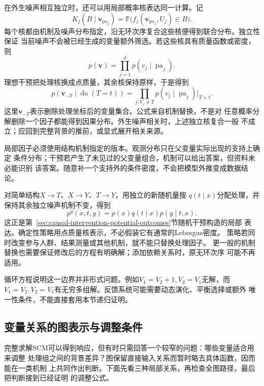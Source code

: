 在外生噪声相互独立时，还可以用局部概率核表达同一计算。记
\[
  K_j(B\mid\bm v_{\operatorname{pa}_j})
  =
  \mathbb P\bigl(f_j(\bm v_{\operatorname{pa}_j},U_j)\in B\bigr).
\]
每个核都由机制及噪声分布指定，沿无环次序复合这些核便得到联合分布。独立性保证
当前噪声不会被已经生成的变量额外筛选。若这些核具有质量函数或密度，则
\[
  p(\bm v)=\prod_{j=1}^d p(v_j\mid\operatorname{pa}_j).
\]
理想干预把处理核换成点质量，其余核保持原样，于是得到
\begin{equation}
  p(\bm v_{-T}\mid\operatorname{do}(T=t))
  =
  \prod_{j:V_j\ne T}
  p(v_j\mid\operatorname{pa}_j)\big|_{T=t}.
  \label{eq:causal-truncated-factorization}
\end{equation}
这里\(\bm v_{-T}\)表示删除处理坐标后的变量集合。公式来自机制替换，不是对
任意概率分解删除一个因子都能得到因果分布。外生噪声相关时，上述独立核复合一般
不成立；应回到完整背景的推前，或显式展开相关来源。

局部因子必须使用结构机制指定的版本。观测分布只在父变量实际出现的支持上确定
条件分布；干预若产生了未见过的父变量组合，机制可以给出答案，但资料未必能识别
该答案。随意补一个支持外的条件密度，不会把模型外推变成数据结论。

对简单结构\(X\to T\)、\(X\to Y\)、\(T\to Y\)，用独立的新随机量按
\(q(t\mid x)\)分配处理，并保持其余独立噪声机制不变，得到
\begin{equation}
  p^q(x,t,y)=p(x)q(t\mid x)p(y\mid t,x).
  \label{eq:causal-stochastic-intervention}
\end{equation}
这正是第~\ref{sec:causal-intervention-potential-outcomes}节随机干预构造的局部
表达。确定性策略用点质量核表示，不必假装它有通常的Lebesgue密度。
策略若同时改变参与人群、结果测量或其他机制，就不能只替换处理因子。
更一般的机制替换也需要保证修改后的方程有明确解；添加依赖关系时，原无环次序
可能不再适用。

循环方程说明这一边界并非形式问题。例如\(V_1=V_2+1,V_2=V_1\)无解，而
\(V_1=V_2,V_2=V_1\)有无穷多组解。反馈系统可能需要动态演化、平衡选择或额外
唯一性条件，不能直接套用本节递归证明。

\subsection{变量关系的图表示与调整条件}
\label{sec:causal-graph-adjustment}

完整求解SCM可以得到响应，但有时只需回答一个较窄的问题：哪些变量适合用来调整
处理组之间的背景差异？图保留直接输入关系而暂时略去具体函数，因而能在一类机制
上共同作出判断。下面先看三种局部关系，再检查全图路径，最后把判断接到已经证明
的调整公式。

